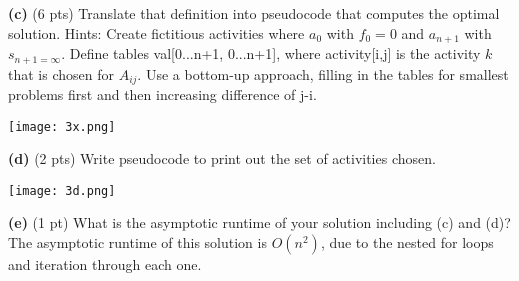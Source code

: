 \documentclass[12pt]{article}
\begin{document}
  \linebreak
\textbf{(c)} (6 pts) Translate that definition into pseudocode that computes the optimal solution. Hints: Create fictitious activities where $a_0$ with $f_0 = 0$ and $a_{n+1}$ with $s_{n+1 = \infty}. $ Define tables val[0...n+1, 0...n+1], where activity[i,j] is the activity $k$ that is chosen for $A_{ij}$. Use a bottom-up approach, filling in the tables for smallest problems first and then increasing difference of j-i. \\
\linebreak
\begin{center}
\texttt{[image: 3x.png]} \\
\end{center}
\linebreak
\textbf{(d)} (2 pts) Write pseudocode to print out the set of activities chosen. \\
\linebreak
\begin{center}
\texttt{[image: 3d.png]} \\
\end{center}
\linebreak
\textbf{(e)} (1 pt) What is the asymptotic runtime of your solution including (c) and (d)? \\
\linebreak
The asymptotic runtime of this solution is $O(n^2)$, due to the nested for loops and iteration through each one. 
\end{document}
